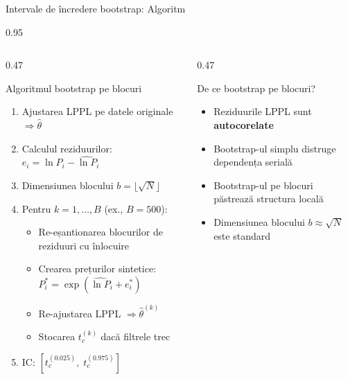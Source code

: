 \documentclass[9pt, aspectratio=169, t]{beamer}
\begin{document}
\begin{frame}{Intervale de încredere bootstrap: Algoritm}
    \begin{cminipage}{0.95\textwidth}
    {\footnotesize
    \begin{columns}[T]
        \begin{column}{0.47\textwidth}
            \begin{block}{Algoritmul bootstrap pe blocuri}
                \begin{enumerate}\setlength{\itemsep}{1pt}
                    \item Ajustarea LPPL pe datele originale $\Rightarrow \hat{\theta}$
                    \item Calculul reziduurilor: $e_i = \ln P_i - \widehat{\ln P}_i$
                    \item Dimensiunea blocului $b = \lfloor\sqrt{N}\rfloor$
                    \item Pentru $k = 1, \ldots, B$ (ex., $B = 500$):
                    \begin{itemize}\setlength{\itemsep}{0pt}
                        \item Re-eșantionarea blocurilor de reziduuri cu înlocuire
                        \item Crearea prețurilor sintetice: $P^*_i = \exp(\widehat{\ln P}_i + e^*_i)$
                        \item Re-ajustarea LPPL $\Rightarrow \hat{\theta}^{(k)}$
                        \item Stocarea $t_c^{(k)}$ dacă filtrele trec
                    \end{itemize}
                    \item IC: $[t_c^{(0.025)},\; t_c^{(0.975)}]$
                \end{enumerate}
            \end{block}
        \end{column}
        \begin{column}{0.47\textwidth}
            \begin{alertblock}{De ce bootstrap pe blocuri?}
                \begin{itemize}\setlength{\itemsep}{1pt}
                    \item Reziduurile LPPL sunt \textbf{autocorelate}
                    \item Bootstrap-ul simplu distruge dependența serială
                    \item Bootstrap-ul pe blocuri păstrează structura locală
                    \item Dimensiunea blocului $b \approx \sqrt{N}$ este standard
                \end{itemize}
            \end{alertblock}


\end{column}
\end{columns}}
\end{cminipage}
\end{frame}
\end{document}

